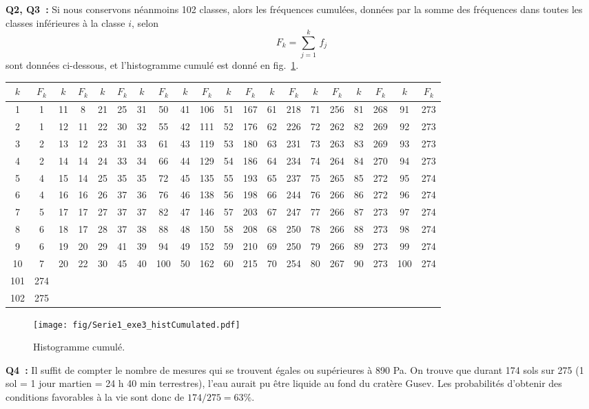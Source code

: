 \textbf{Q2, Q3~:} Si nous conservons néanmoins 102 classes, alors les fréquences cumulées, données par la somme des fréquences dans toutes les classes inférieures à la classe $i$, selon
$$
F_k=\sum\limits_{j=1}^{k}\,f_j
$$
sont données ci-dessous, et l'histogramme cumulé est donné en fig.~\ref{fig:ch}.
\begin{center}
\scriptsize
\begin{tabular}{cccccccccccccccccccc}
$k$ & $F_k$ & $k$ & $F_k$ & $k$ & $F_k$ & $k$ & $F_k$ & $k$ & $F_k$ & $k$ & $F_k$ & $k$ & $F_k$ & $k$ & $F_k$ & $k$ & $F_k$ & $k$ & $F_k$ \\\hline
 1 & 1 & 11 &  8 & 21 & 25 & 31 &  50 & 41 & 106 & 51 & 167 & 61 & 218 & 71 & 256 & 81 & 268 &  91 & 273\\
 2 & 1 & 12 & 11 & 22 & 30 & 32 &  55 & 42 & 111 & 52 & 176 & 62 & 226 & 72 & 262 & 82 & 269 &  92 & 273\\
 3 & 2 & 13 & 12 & 23 & 31 & 33 &  61 & 43 & 119 & 53 & 180 & 63 & 231 & 73 & 263 & 83 & 269 &  93 & 273\\
 4 & 2 & 14 & 14 & 24 & 33 & 34 &  66 & 44 & 129 & 54 & 186 & 64 & 234 & 74 & 264 & 84 & 270 &  94 & 273\\
 5 & 4 & 15 & 14 & 25 & 35 & 35 &  72 & 45 & 135 & 55 & 193 & 65 & 237 & 75 & 265 & 85 & 272 &  95 & 274\\
 6 & 4 & 16 & 16 & 26 & 37 & 36 &  76 & 46 & 138 & 56 & 198 & 66 & 244 & 76 & 266 & 86 & 272 &  96 & 274\\
 7 & 5 & 17 & 17 & 27 & 37 & 37 &  82 & 47 & 146 & 57 & 203 & 67 & 247 & 77 & 266 & 87 & 273 &  97 & 274\\
 8 & 6 & 18 & 17 & 28 & 37 & 38 &  88 & 48 & 150 & 58 & 208 & 68 & 250 & 78 & 266 & 88 & 273 &  98 & 274\\
 9 & 6 & 19 & 20 & 29 & 41 & 39 &  94 & 49 & 152 & 59 & 210 & 69 & 250 & 79 & 266 & 89 & 273 &  99 & 274\\
10 & 7 & 20 & 22 & 30 & 45 & 40 & 100 & 50 & 162 & 60 & 215 & 70 & 254 & 80 & 267 & 90 & 273 & 100 & 274\\
101 & 274 \\
102 & 275 \\\hline
\end{tabular}
\normalsize
\end{center}

\begin{figure}
   \centering
   \vspace{-5mm}
   \texttt{[image: fig/Serie1\_exe3\_histCumulated.pdf]}
   \caption{Histogramme cumulé.}
   \label{fig:ch}
\end{figure}
\textbf{Q4~:} Il suffit de compter le nombre de mesures qui se trouvent égales ou supérieures à 890 Pa. On trouve que durant 174 sols sur 275 (1 sol = 1 jour martien = 24 h 40 min terrestres), l'eau aurait pu être liquide au fond du cratère Gusev. Les probabilités d'obtenir des conditions favorables à la vie sont donc de $174/275=63\%$.

